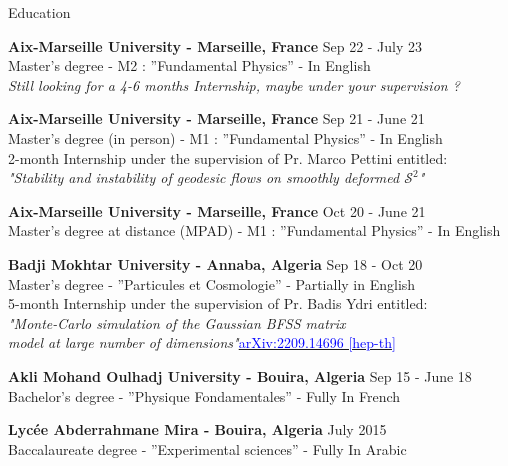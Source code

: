\documentclass{resume} %
\begin{document}
\begin{rSection}{Education}

{\bf Aix-Marseille University - Marseille, France} \hfill {Sep 22 - July 23}
\\ 
{\small\hspace*{0.3cm}Master’s degree - M2 : ”Fundamental Physics” - In English\\
\hspace*{0.3cm}\textit{Still looking for a 4-6 months Internship, maybe under your supervision ?}}

{\bf Aix-Marseille University - Marseille, France} \hfill {Sep 21 - June 21}
\\ 
{\small\hspace*{0.3cm}Master’s degree (in person) - M1 : ”Fundamental Physics” - In English\\
\hspace*{0.3cm}2-month Internship under the supervision of Pr. Marco Pettini entitled: 
\\\hspace*{0.3cm}\textit{"Stability and instability of geodesic flows on smoothly deformed $\mathcal{S}^2$"}}

{\bf Aix-Marseille University - Marseille, France} \hfill {Oct 20 - June 21}
\\ 
{\small\hspace*{0.3cm}Master’s degree at distance (MPAD) - M1 : ”Fundamental Physics” - In English}

{\textbf{Badji Mokhtar University - Annaba, Algeria}}  \hfill Sep 18 - Oct 20\\
{\small\hspace*{0.3cm}Master’s degree - ”Particules et Cosmologie” - Partially in English\\
\hspace*{0.3cm}5-month Internship under the supervision of Pr. Badis Ydri entitled: 
\\\hspace*{0.3cm}\textit{"Monte-Carlo simulation of the
Gaussian BFSS matrix\\\hspace*{0.1cm}model at large number of dimensions"}\hspace*{0.1cm}\href{https://arxiv.org/abs/2209.14696}{\textcolor{blue}{arXiv:2209.14696 [hep-th]}}}

{\textbf{Akli Mohand Oulhadj University - Bouira, Algeria}}  \hfill Sep 15 - June 18\\
{\small\hspace*{0.3cm}Bachelor’s degree - ”Physique Fondamentales” - Fully In French}\

{\textbf{Lycée Abderrahmane Mira - Bouira, Algeria}}  \hfill July 2015\\
{\small\hspace*{0.3cm}Baccalaureate degree - ”Experimental sciences” - Fully In Arabic}\
\end{rSection}
\end{document}

